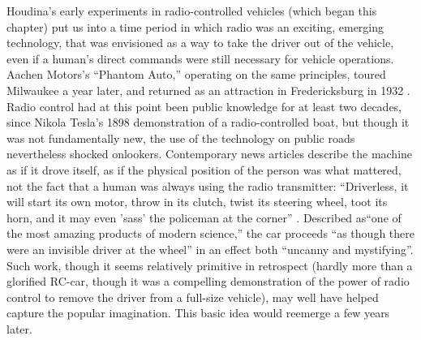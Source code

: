 Houdina's early experiments in radio-controlled vehicles (which began
this chapter) put us into a time period in which radio was an
exciting, emerging technology, that was envisioned as a way to take
the driver out of the vehicle, even if a human's direct commands were
still necessary for vehicle operations. Aachen Motors's ``Phantom
Auto,'' operating on the same principles, toured Milwaukee a year
later, \cite{phantomAuto} and returned as an attraction in
Fredericksburg in 1932 \cite{phantomAuto2}. 
Radio control had at this point been public knowledge for at least two
decades, since Nikola Tesla's 1898 demonstration of a radio-controlled
boat, but though it was not fundamentally new, the use of the
technology on public roads nevertheless shocked onlookers.
Contemporary news articles describe the machine as if it drove itself,
as if the physical position of the person was what mattered, not the
fact that a human was always using the radio transmitter:  ``Driverless,
it will start its own motor, throw in its clutch, twist its steering
wheel, toot its horn, and it may even 'sass' the policeman at the
corner'' \cite{phantomAuto}. Described as``one of the most amazing products of
modern science,'' the 
car proceeds ``as though there were an invisible driver at the wheel''
in an effect both ``uncanny and mystifying''\cite{phantomAuto2}. Such work,
though it seems relatively primitive in retrospect (hardly more than a
glorified RC-car, though it was a compelling demonstration of the
power of radio control to remove the driver from a full-size vehicle), may well have
helped capture the popular imagination. This basic idea would reemerge
a few years later.

